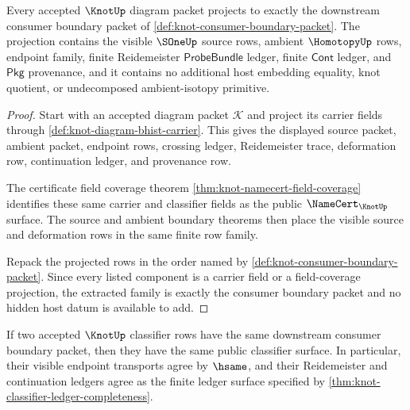 \begin{theorem}\label{thm:knot-consumer-boundary-extraction}
Every accepted $\KnotUp$ diagram packet projects to exactly the downstream
consumer boundary packet of
\autoref{def:knot-consumer-boundary-packet}. The projection contains the
visible $\SOneUp$ source rows, ambient $\HomotopyUp$ rows, endpoint family,
finite Reidemeister $\mathsf{ProbeBundle}$ ledger, finite $\mathsf{Cont}$
ledger, and $\mathsf{Pkg}$ provenance, and it contains no additional host
embedding equality, knot quotient, or undecomposed ambient-isotopy primitive.
\end{theorem}

\begin{proof}
Start with an accepted diagram packet $\mathcal{K}$ and project its carrier
fields through \autoref{def:knot-diagram-bhist-carrier}. This gives the
displayed source packet, ambient packet, endpoint rows, crossing ledger,
Reidemeister trace, deformation row, continuation ledger, and provenance row.

The certificate field coverage theorem
\autoref{thm:knot-namecert-field-coverage} identifies these same carrier and
classifier fields as the public $\NameCert_{\KnotUp}$ surface. The source and
ambient boundary theorems then place the visible source and deformation rows
in the same finite row family.

Repack the projected rows in the order named by
\autoref{def:knot-consumer-boundary-packet}. Since every listed component is a
carrier field or a field-coverage projection, the extracted family is exactly
the consumer boundary packet and no hidden host datum is available to add.
\end{proof}

\begin{theorem}\label{thm:knot-consumer-classifier-determinacy}
If two accepted $\KnotUp$ classifier rows have the same downstream consumer
boundary packet, then they have the same public classifier surface. In
particular, their visible endpoint transports agree by $\hsame$, and their
Reidemeister and continuation ledgers agree as the finite ledger surface
specified by \autoref{thm:knot-classifier-ledger-completeness}.
\end{theorem}


